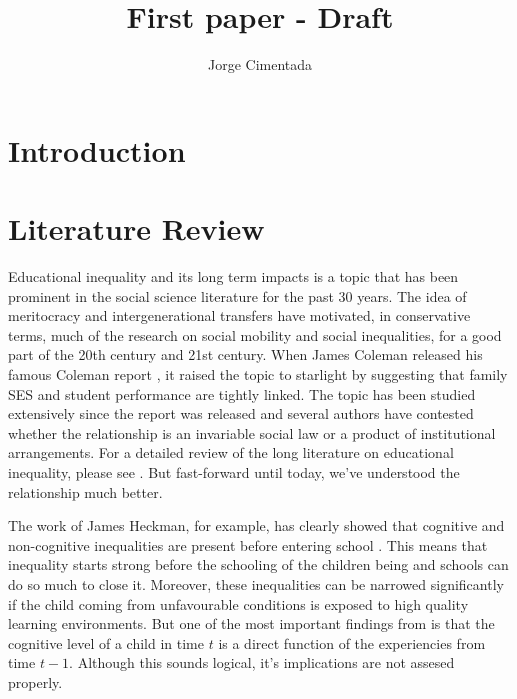 \documentclass[11pt, a4paper]{article}\usepackage[]{graphicx}\usepackage[]{color}
\title{First paper - Draft}
\author{Jorge Cimentada}
\begin{document}
\setlength{\parindent}{2em}
\setlength{\parskip}{1em}

\maketitle





\tableofcontents












\section{Introduction}

\section{Literature Review}
Educational inequality and its long term impacts is a topic that has been prominent in the social science literature for the past 30 years. The idea of meritocracy and intergenerational transfers have motivated, in conservative terms, much of the research on social mobility and social inequalities, for a good part of the 20th century and 21st century. When James Coleman released his famous Coleman report \citep{coleman1966}, it raised the topic to starlight by suggesting that family SES and student performance are tightly linked. The topic has been studied extensively since the report was released and several authors have contested whether the relationship is an invariable social law or a product of institutional arrangements. For a detailed review of the long literature on educational inequality, please see \citet{gamoran2001}. But fast-forward until today, we've understood the relationship much better.

The work of James Heckman, for example, has clearly showed that cognitive and non-cognitive inequalities are present before entering school \citep{heckman2006}. This means that inequality starts strong before the schooling of the children being and schools can do so much to close it. Moreover, these inequalities can be narrowed significantly if the child coming from unfavourable conditions is exposed to high quality learning environments. But one of the most important findings from \citet{cunha2006} is that the cognitive level of a child in time \(t\) is a direct function of the experiencies from time \(t-1\). Although this sounds logical, it's implications are not assesed properly.
\end{document}
